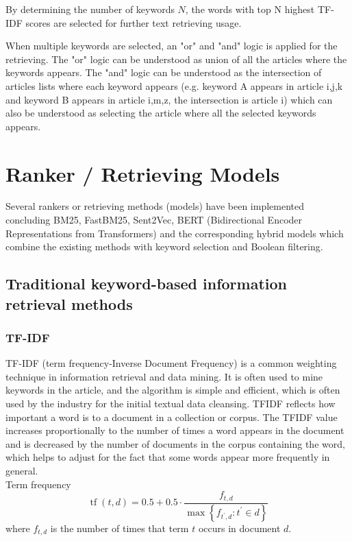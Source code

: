 \documentclass[10pt,a4paper,fleqn]{report}
\begin{document}
	By determining the number of keywords $N$, the words with top N highest TF-IDF scores are selected for further text retrieving usage.
	
	When multiple keywords are selected, an "or" and "and" logic is applied for the retrieving. 
	The "or" logic can be understood as union of all the articles where the keywords appears.
	The "and" logic can be understood as the intersection of articles lists where each keyword appears (e.g. keyword A appears in article i,j,k and keyword B appears in article i,m,z, the intersection is article i) which can also be understood as selecting the article where all the selected keywords appears.
	
	\section{Ranker / Retrieving Models}
	Several rankers or retrieving methods (models) have been implemented concluding BM25, FastBM25, Sent2Vec, BERT (Bidirectional Encoder Representations from Transformers) and the corresponding hybrid models which combine the existing methods with keyword selection and Boolean filtering.
		
		\subsection{Traditional keyword-based information retrieval methods}		
			\subsubsection{TF-IDF}		
			
				TF-IDF (term frequency-Inverse Document Frequency) is a common weighting technique in information retrieval and data mining. It is often used to mine keywords in the article, and the algorithm is simple and efficient, which is often used by the industry for the initial textual data cleansing. TFIDF reflects how important a word is to a document in a collection or corpus. The TFIDF value increases proportionally to the number of times a word appears in the document and is decreased by the number of documents in the corpus containing the word, which helps to adjust for the fact that some words appear more frequently in general.\\
				
				Term frequency
				$$\operatorname{tf}(t, d)=0.5+0.5 \cdot \frac{f_{t, d}}{\max \left\{f_{t^{\prime}, d}: t^{\prime} \in d\right\}}$$
				where $f_{t,d}$ is the number of times that term $t$ occurs in document $d$. 
				
\end{document}
